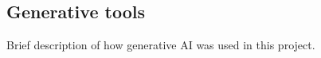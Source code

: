 \documentclass[a4paper]{article}
\begin{document}


\subsection{Generative tools}
Brief description of how generative AI was used in this project.




\end{document}
